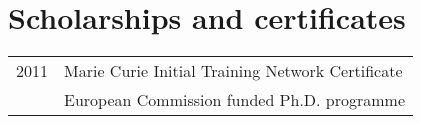 \documentclass[a4paper,10pt]{article}
\begin{document}
%

\section{Scholarships and certificates}
\begin{tabular}{rp{11cm}}
\textsc{2011} & Marie Curie Initial Training Network Certificate \\
          & \footnotesize{European Commission funded Ph.D. programme}
\end{tabular}

\end{document}
